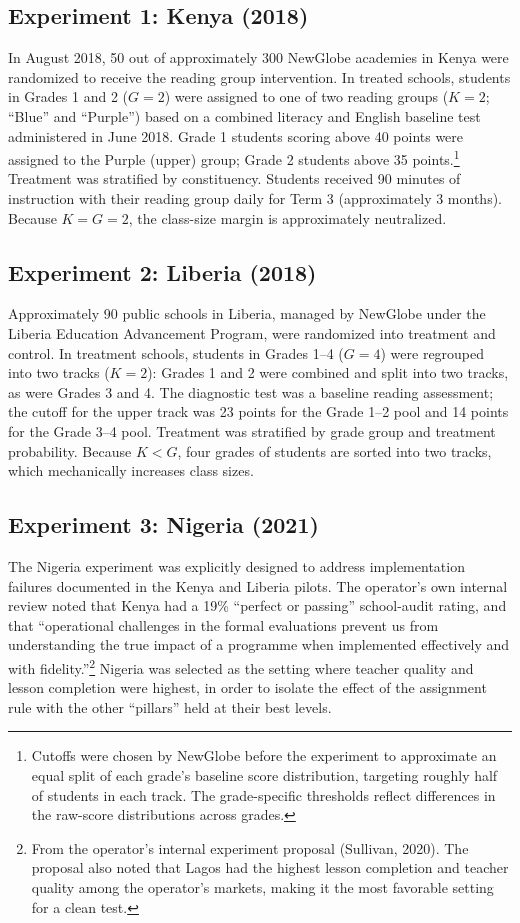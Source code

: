 \documentclass[11pt]{article}
\begin{document}
\subsection{Experiment 1: Kenya (2018)}

In August 2018, 50 out of approximately 300 NewGlobe academies in Kenya were randomized to receive the reading group intervention. In treated schools, students in Grades 1 and 2 ($G = 2$) were assigned to one of two reading groups ($K = 2$; ``Blue'' and ``Purple'') based on a combined literacy and English baseline test administered in June 2018. Grade 1 students scoring above 40 points were assigned to the Purple (upper) group; Grade 2 students above 35 points.\footnote{Cutoffs were chosen by NewGlobe before the experiment to approximate an equal split of each grade's baseline score distribution, targeting roughly half of students in each track. The grade-specific thresholds reflect differences in the raw-score distributions across grades.} Treatment was stratified by constituency. Students received 90 minutes of instruction with their reading group daily for Term 3 (approximately 3 months). Because $K = G = 2$, the class-size margin is approximately neutralized.

\subsection{Experiment 2: Liberia (2018)}

Approximately 90 public schools in Liberia, managed by NewGlobe under the Liberia Education Advancement Program, were randomized into treatment and control. In treatment schools, students in Grades 1--4 ($G = 4$) were regrouped into two tracks ($K = 2$): Grades 1 and 2 were combined and split into two tracks, as were Grades 3 and 4. The diagnostic test was a baseline reading assessment; the cutoff for the upper track was 23 points for the Grade 1--2 pool and 14 points for the Grade 3--4 pool. Treatment was stratified by grade group and treatment probability. Because $K < G$, four grades of students are sorted into two tracks, which mechanically increases class sizes.

\subsection{Experiment 3: Nigeria (2021)}

The Nigeria experiment was explicitly designed to address implementation failures documented in the Kenya and Liberia pilots. The operator's own internal review noted that Kenya had a 19\% ``perfect or passing'' school-audit rating, and that ``operational challenges in the formal evaluations prevent us from understanding the true impact of a programme when implemented effectively and with fidelity.''\footnote{From the operator's internal experiment proposal (Sullivan, 2020). The proposal also noted that Lagos had the highest lesson completion and teacher quality among the operator's markets, making it the most favorable setting for a clean test.} Nigeria was selected as the setting where teacher quality and lesson completion were highest, in order to isolate the effect of the assignment rule with the other ``pillars'' held at their best levels.
\end{document}

